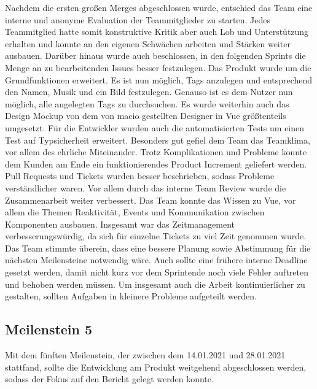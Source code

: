\documentclass[10pt, a4paper]{article}
\begin{document}
\begin{onehalfspace}
Nachdem die ersten großen Merges abgeschlossen wurde, entschied das Team eine interne und anonyme Evaluation der Teammitglieder zu starten.
Jedes Teammitglied hatte somit konstruktive Kritik aber auch Lob und Unterstützung erhalten und konnte an den eigenen Schwächen arbeiten und Stärken weiter ausbauen.
Darüber hinaus wurde auch beschlossen, in den folgenden Sprints die Menge an zu bearbeitenden Issues besser festzulegen.
Das Produkt wurde um die Grundfunktionen erweitert.
Es ist nun möglich, Tags anzulegen und entsprechend den Namen, Musik und ein Bild festzulegen.
Genauso ist es dem Nutzer nun möglich, alle angelegten Tags zu durchsuchen.
Es wurde weiterhin auch das Design Mockup von dem von macio gestellten Designer in Vue größtenteils umgesetzt.
Für die Entwickler wurden auch die automatisierten Tests um einen Test auf Typsicherheit erweitert.
Besonders gut gefiel dem Team das Teamklima, vor allem des ehrliche Miteinander.
Trotz Komplikationen und Probleme konnte dem Kunden am Ende ein funktionierendes Product Increment geliefert werden.
Pull Requests und Tickets wurden besser beschrieben, sodass Probleme verständlicher waren.
Vor allem durch das interne Team Review wurde die Zusammenarbeit weiter verbessert.
Das Team konnte das Wissen zu Vue, vor allem die Themen Reaktivität, Events und Kommunikation zwischen Komponenten ausbauen.
Insgesamt war das Zeitmanagement verbesserungswürdig, da sich für einzelne Tickets zu viel Zeit genommen wurde.
Das Team stimmte überein, dass eine bessere Planung sowie Abstimmung für die nächsten Meilensteine notwendig wäre.
Auch sollte eine frühere interne Deadline gesetzt werden, damit nicht kurz vor dem Sprintende noch viele Fehler auftreten und behoben werden müssen.
Um insgesamt auch die Arbeit kontinuierlicher zu gestalten, sollten Aufgaben in kleinere Probleme aufgeteilt werden.

\subsection{Meilenstein 5}
Mit dem fünften Meilenstein, der zwischen dem 14.01.2021 und 28.01.2021 stattfand, sollte die Entwicklung am Produkt weitgehend abgeschlossen werden, sodass der Fokus auf den Bericht gelegt werden konnte.


\end{onehalfspace}
\end{document}
